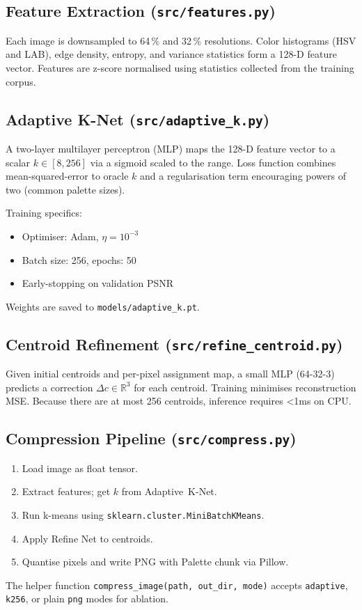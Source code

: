 \documentclass[11pt]{article}
\begin{document}
\subsection{Feature Extraction (\texttt{src/features.py})}
Each image is downsampled to 64\,\% and 32\,\% resolutions. Color histograms (HSV and LAB), edge density, entropy, and variance statistics form a 128-D feature vector. Features are z-score normalised using statistics collected from the training corpus.

\subsection{Adaptive K-Net (\texttt{src/adaptive\_k.py})}
A two-layer multilayer perceptron (MLP) maps the 128-D feature vector to a scalar $k \in [8,256]$ via a sigmoid scaled to the range. Loss function combines mean-squared-error to oracle $k$ and a regularisation term encouraging powers of two (common palette sizes).

Training specifics:
\begin{itemize}
  \item Optimiser: Adam, $\eta=10^{-3}$
  \item Batch size: 256, epochs: 50
  \item Early-stopping on validation PSNR
\end{itemize}
Weights are saved to \texttt{models/adaptive\_k.pt}.

\subsection{Centroid Refinement (\texttt{src/refine\_centroid.py})}
Given initial centroids and per-pixel assignment map, a small MLP (64-32-3) predicts a correction $\Delta c \in \mathbb{R}^3$ for each centroid. Training minimises reconstruction MSE. Because there are at most 256 centroids, inference requires \textless1ms on CPU.

\subsection{Compression Pipeline (\texttt{src/compress.py})}
\begin{enumerate}
  \item Load image as float tensor.
  \item Extract features; get $k$ from Adaptive~K-Net.
  \item Run k-means using \texttt{sklearn.cluster.MiniBatchKMeans}.
  \item Apply Refine Net to centroids.
  \item Quantise pixels and write PNG with Palette chunk via Pillow.
\end{enumerate}
The helper function \texttt{compress\_image(path, out\_dir, mode)} accepts \texttt{adaptive}, \texttt{k256}, or plain \texttt{png} modes for ablation.
\end{document}
